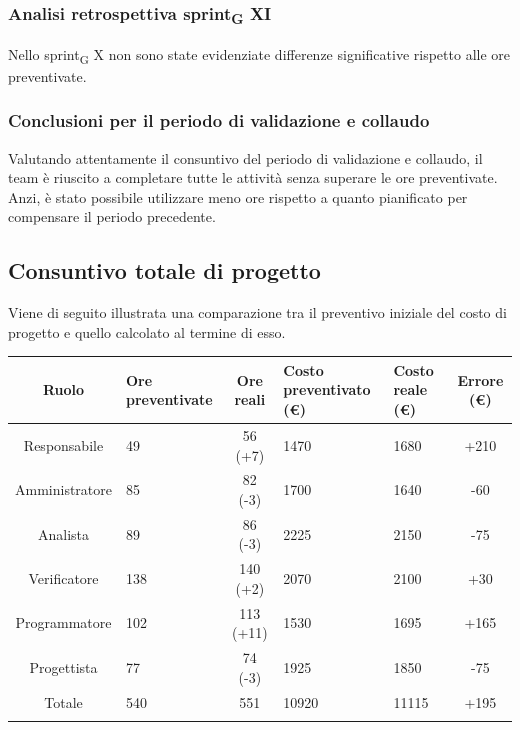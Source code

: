 \subsubsection{Analisi retrospettiva sprint\textsubscript{G} XI}

Nello sprint\textsubscript{G} X non sono state evidenziate differenze significative rispetto alle ore preventivate.

\subsubsection{Conclusioni per il periodo di validazione e collaudo}

Valutando attentamente il consuntivo del periodo di validazione e collaudo, il team è riuscito a completare tutte le attività senza superare le ore preventivate. 
Anzi, è stato possibile utilizzare meno ore rispetto a quanto pianificato per compensare il periodo precedente. 






















\newpage

\subsection{Consuntivo totale di progetto}
Viene di seguito illustrata una comparazione tra il preventivo iniziale del costo di progetto e quello calcolato al termine di esso.
\setlength\extrarowheight{5pt}
\begin{tabularx}{\textwidth}{|c|XcXX|c|}
	\hline
	\rowcolor{white}
	\textbf{Ruolo} & \textbf{Ore preventivate} & \textbf{Ore reali} & \textbf{Costo preventivato (€)} & \textbf{Costo reale (€)} & \textbf{Errore (€)} \\
	\hline
	Responsabile &49& 56 (+7) &1470&1680& +210 \\ 
	Amministratore &85& 82 (-3) &1700&1640& -60\\
	Analista &89&86 (-3)&2225&2150& -75 \\
	Verificatore &138&140 (+2)&2070&2100& +30 \\
	Programmatore &102&113 (+11)&1530&1695& +165 \\
	Progettista &77&74 (-3)&1925&1850& -75 \\
	\hline
	Totale &540&551&10920&11115&+195\\
	\hline
	\rowcolor{white}
	\caption{Consuntivo totale di ore e costi per ruolo}
\end{tabularx}


